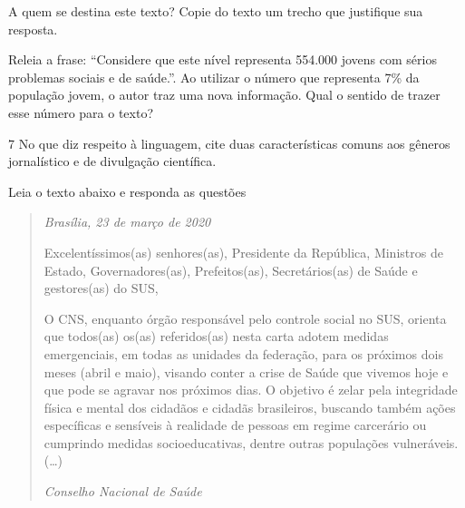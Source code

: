 
\begin{escolha}
  \item A quem se destina este texto? Copie do texto um trecho que justifique
  sua resposta.


  \item Releia a frase: ``Considere que este nível representa 554.000 jovens
  com sérios problemas sociais e de saúde.''. Ao utilizar o número que
  representa 7\% da população jovem, o autor traz uma nova informação.
  Qual o sentido de trazer esse número para o texto?


\end{escolha}

\num{7} No que diz respeito à linguagem, cite duas características comuns aos gêneros
jornalístico e de divulgação científica.


Leia o texto abaixo e responda as questões

\begin{quote}

\emph{Brasília, 23 de março de 2020}

Excelentíssimos(as) senhores(as), Presidente da República, Ministros de
Estado, Governadores(as), Prefeitos(as), Secretários(as) de Saúde e
gestores(as) do SUS,

O CNS, enquanto órgão responsável pelo controle social no SUS, orienta
que todos(as) os(as) referidos(as) nesta carta adotem medidas
emergenciais, em todas as unidades da federação, para os próximos dois
meses (abril e maio), visando conter a crise de Saúde que vivemos hoje e
que pode se agravar nos próximos dias. O objetivo é zelar pela
integridade física e mental dos cidadãos e cidadãs brasileiros, buscando
também ações específicas e sensíveis à realidade de pessoas em regime
carcerário ou cumprindo medidas socioeducativas, dentre outras
populações vulneráveis. (\ldots{})

\emph{Conselho Nacional de Saúde} 

\end{quote} 

